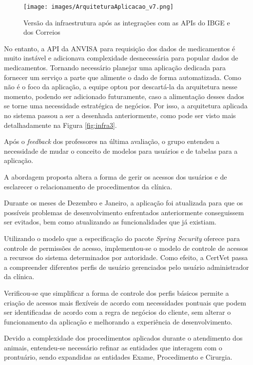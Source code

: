 \documentclass[
    12pt,               %
    openright,          %
    oneside,
    a4paper,            %
    BIBLATEX,           %
    TODO,               %
    english,            %
    brazil              %
    ]{ifsp-spo-inf-ctds}
\begin{document}
    \begin{figure}[H]
            \centering
            \caption{Versão da infraestrutura após as integrações com as APIs do IBGE e dos Correios}
            \centering
            \texttt{[image: images/ArquiteturaAplicacao\_v7.png]}
            \label{fig:infra4}
        \end{figure}

    No entanto, a API da ANVISA para requisição dos dados de medicamentos é muito instável e adicionava complexidade desnecessária para popular dados de medicamentos.
    Tornando necessário planejar uma aplicação dedicada para fornecer um serviço a parte que alimente o dado de forma automatizada. Como não é o foco da aplicação, a equipe optou por descartá-la da arquitetura nesse momento, podendo ser adicionado futuramente, caso a alimentação desses dados se torne uma necessidade estratégica de negócios. Por isso, a arquitetura aplicada no sistema passou a ser a desenhada anteriormente, como pode ser visto mais detalhadamente na Figura \ref{fig:infra3}.


    Após o \emph{feedback} dos professores na última avaliação, o grupo entendeu a necessidade de mudar o conceito de modelos para usuários e de tabelas para a aplicação.

    A abordagem proposta altera a forma de gerir os acessos dos usuários e de esclarecer o relacionamento de procedimentos da clínica.

    Durante os meses de Dezembro e Janeiro, a aplicação foi atualizada para que os possíveis problemas de desenvolvimento enfrentados anteriormente conseguissem ser evitados, bem como atualizando as funcionalidades que já existiam.

    Utilizando o modelo que a especificação do pacote \emph{Spring Security} oferece para controle de permissões de acesso, implementou-se o modelo de controle de acessos a recursos do sistema determinados por autoridade. Como efeito, a CertVet passa a compreender diferentes perfis de usuário gerenciados pelo usuário administrador da clínica.

    Verificou-se que simplificar a forma de controle dos perfis básicos permite a criação de acessos mais flexíveis de acordo com necessidades pontuais que podem ser identificadas de acordo com a regra de negócios do cliente, sem alterar o funcionamento da aplicação e melhorando a experiência de desenvolvimento.

    Devido a complexidade dos procedimentos aplicados durante o atendimento dos animais, entendeu-se necessário refinar as entidades que interagem com o prontuário, sendo expandidas as entidades Exame, Procedimento e Cirurgia.
\end{document}
